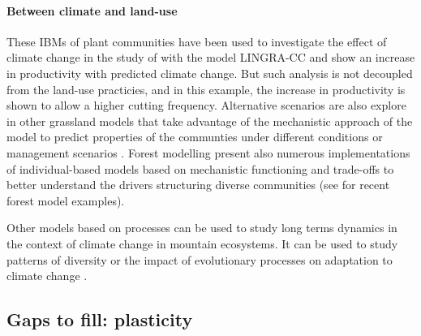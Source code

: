 \paragraph{Between climate and land-use}
These IBMs of plant communities have been used to investigate the effect of climate change in the study of \cite{rodriguez_lingra-cc:_1999} with the model LINGRA-CC and show an increase in productivity with predicted climate change. But such analysis is not decoupled from the land-use practicies, and in this example, the increase in productivity is shown to allow a higher cutting frequency. Alternative scenarios are also explore in other grassland models that take advantage of the mechanistic approach of the model to predict properties of the communties under different conditions or management scenarios \cite{taubert_review_2012, taubert_modelling_2014, maire_plasticity_2013, maire_trade-off_2009}. Forest modelling present also numerous implementations of individual-based models based on mechanistic functioning and trade-offs to better understand the drivers structuring diverse communities (see \cite{ falster_plant:_2016, marechaux_individual-based_2017} for recent forest model examples).

Other models based on processes can be used to study long terms dynamics in the context of climate change in mountain ecosystems. It can be used to study patterns of diversity \parencite{isabelle_fate-hd:_2014} or the impact of evolutionary processes on adaptation to climate change \parencite{cotto_dynamic_2017}.






\subsection{Gaps to fill: plasticity}

